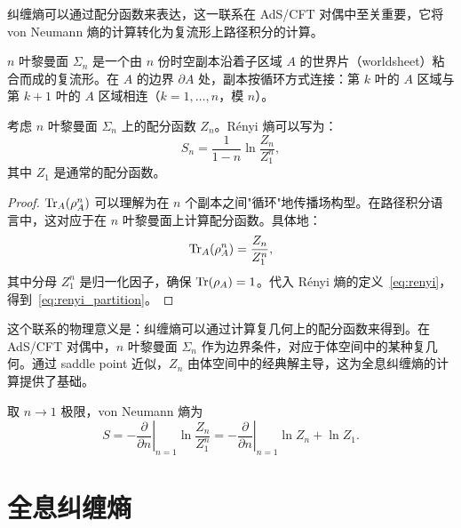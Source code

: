 纠缠熵可以通过配分函数来表达，这一联系在 AdS/CFT 对偶中至关重要，它将 von Neumann 熵的计算转化为复流形上路径积分的计算。

\begin{definition}[$n$ 叶黎曼面]
$n$ 叶黎曼面 $\Sigma_n$ 是一个由 $n$ 份时空副本沿着子区域 $A$ 的世界片（worldsheet）粘合而成的复流形。在 $A$ 的边界 $\partial A$ 处，副本按循环方式连接：第 $k$ 叶的 $A$ 区域与第 $k+1$ 叶的 $A$ 区域相连（$k = 1, \ldots, n$，模 $n$）。
\end{definition}

\begin{theorem}[纠缠熵与配分函数的联系]\label{thm:partition_function}
考虑 $n$ 叶黎曼面 $\Sigma_n$ 上的配分函数 $Z_n$。Rényi 熵可以写为：
\begin{equation}\label{eq:renyi_partition}
    S_n = \frac{1}{1-n} \ln \frac{Z_n}{Z_1^n},
\end{equation}
其中 $Z_1$ 是通常的配分函数。
\end{theorem}

\begin{proof}
$\Tr_A(\rho_A^n)$ 可以理解为在 $n$ 个副本之间"循环"地传播场构型。在路径积分语言中，这对应于在 $n$ 叶黎曼面上计算配分函数。具体地：
\begin{equation}
    \Tr_A(\rho_A^n) = \frac{Z_n}{Z_1^n},
\end{equation}
其中分母 $Z_1^n$ 是归一化因子，确保 $\Tr(\rho_A) = 1$。代入 Rényi 熵的定义~\eqref{eq:renyi}，得到~\eqref{eq:renyi_partition}。
\end{proof}

\begin{note}[物理意义]
这个联系的物理意义是：纠缠熵可以通过计算复几何上的配分函数来得到。在 AdS/CFT 对偶中，$n$ 叶黎曼面 $\Sigma_n$ 作为边界条件，对应于体空间中的某种复几何。通过 saddle point 近似，$Z_n$ 由体空间中的经典解主导，这为全息纠缠熵的计算提供了基础。
\end{note}

取 $n \to 1$ 极限，von Neumann 熵为
\begin{equation}
    S = -\left.\frac{\partial}{\partial n}\right|_{n=1} \ln \frac{Z_n}{Z_1^n} = -\left.\frac{\partial}{\partial n}\right|_{n=1} \ln Z_n + \ln Z_1.
\end{equation}

\section{全息纠缠熵}

